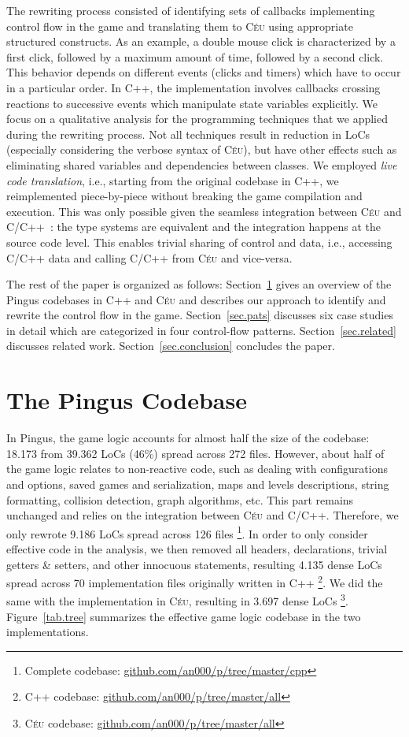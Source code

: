 \documentclass{vgtc}                          %
\newcommand{\CEU}{\textsc{C\'{e}u}\xspace}
\begin{document}
The rewriting process consisted of identifying sets of callbacks implementing
control flow in the game and translating them to \CEU using appropriate
structured constructs.
%
As an example, a double mouse click is characterized by a first click, followed
by a maximum amount of time, followed by a second click.
This behavior depends on different events (clicks and timers) which have to
occur in a particular order.
In C++, the implementation involves callbacks crossing reactions to successive
events which manipulate state variables explicitly.
%
We focus on a qualitative analysis for the programming techniques that we
applied during the rewriting process.
Not all techniques result in reduction in LoCs (especially considering the
verbose syntax of \CEU), but have other effects such as eliminating shared
variables and dependencies between classes.
%
We employed \emph{live code translation}, i.e., starting from the original
codebase in C++, we reimplemented piece-by-piece without breaking the game
compilation and execution.
%
This was only possible given the seamless integration between \CEU and
C/C++~\cite{ceu.sensys13}: the type systems are equivalent and the integration
happens at the source code level.
This enables trivial sharing of control and data, i.e., accessing C/C++ data
and calling C/C++ from \CEU and vice-versa.

The rest of the paper is organized as follows:
Section~\ref{sec.codebase} gives an overview of the Pingus codebases in C++ and
\CEU and describes our approach to identify and rewrite the control flow in the
game.
Section~\ref{sec.pats} discusses six case studies in detail which are
categorized in four control-flow patterns.
Section~\ref{sec.related} discusses related work.
Section~\ref{sec.conclusion} concludes the paper.

\section{The Pingus Codebase}
\label{sec.codebase}

In Pingus, the game logic accounts for almost half the size of the codebase:
18.173 from 39.362 LoCs (46\%) spread across 272 files.
%
However, about half of the game logic relates to non-reactive code, such as
dealing with configurations and options, saved games and serialization, maps
and levels descriptions, string formatting, collision detection, graph
algorithms, etc.
This part remains unchanged and relies on the integration between \CEU and
C/C++.
%
Therefore, we only rewrote 9.186 LoCs spread across 126 files%
\footnote{Complete codebase: \url{github.com/an000/p/tree/master/cpp}}.
%
In order to only consider effective code in the analysis, we then removed all
headers, declarations, trivial getters \& setters, and other innocuous
statements, resulting 4.135 dense LoCs spread across 70 implementation files
originally written in C++%
\footnote{C++ codebase: \url{github.com/an000/p/tree/master/all}}.
We did the same with the implementation in \CEU, resulting in 3.697 dense LoCs%
\footnote{\CEU codebase: \url{github.com/an000/p/tree/master/all}}.
%
Figure~\ref{tab.tree} summarizes the effective game logic codebase in the two
implementations.
\end{document}
